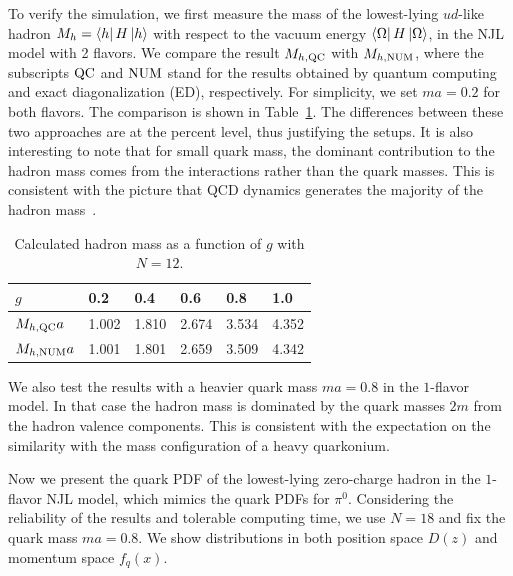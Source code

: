 \documentclass[aps,prl,twocolumn,superscriptaddress,notitlepage,nofootinbib]{revtex4-1}
\begin{document}
To verify the simulation, we first measure the mass of the lowest-lying $ud$-like hadron $M_{h}= \bra{h}H\ket{h}$ with respect to the vacuum energy $\bra{\Omega}H\ket{\Omega}$,  
in the NJL model with 2 flavors. We compare the result $M_{h,{\rm QC}}$ with $M_{h,{\rm NUM}}$, where the subscripts ${\rm QC}$ and ${\rm NUM}$ stand for the results obtained by quantum computing and exact diagonalization (ED), respectively. For simplicity, we set $m a = 0.2 $ for both flavors. The comparison is shown in Table~\ref{tabl-mass}. The differences between these two approaches are at the percent level, thus justifying the setups. It is also interesting to note that for small quark mass, the dominant contribution to the hadron mass comes from the interactions rather than the quark masses. This is consistent with the picture that QCD dynamics generates the majority of the hadron mass~\cite{Ji:1994av,Accardi:2012qut, Anderle:2021wcy,Yang:2018nqn,Ji:2021mtz}. 
%
\begin{table}[htbp]\label{twofcphmass}
	\begin{tabular}{|l|l|l|l|l|l|}
		\hline
		$g$               & 0.2      & 0.4      & 0.6      & 0.8      & 1.0      \\ \hline
		$M_{h,{\rm QC}} a$ & 1.002    & 1.810    & 2.674    & 3.534    & 4.352    \\ \hline
		$M_{h,{\rm NUM}} a$         & 1.001    & 1.801    & 2.659    & 3.509    & 4.342    \\ \hline
	\end{tabular}
	\caption{Calculated hadron mass as a function of $g$ with $N=12$. }
	\label{tabl-mass}
\end{table}
We also test the results with a heavier quark mass $m a = 0.8$ in the $1$-flavor model. In that case the hadron mass is dominated by the quark masses $2m$ from the hadron valence components. This is consistent with the expectation on the similarity with the mass configuration of a heavy quarkonium. 

Now we present the quark PDF of the lowest-lying zero-charge hadron in the $1$-flavor NJL model, which mimics the quark PDFs for $\pi^0$. Considering the reliability of the results and tolerable computing time, we use $N=18$ and fix the quark mass $m a = 0.8 $. We show distributions in both position space $D(z)$ and momentum space $f_q(x)$. 
\end{document}
